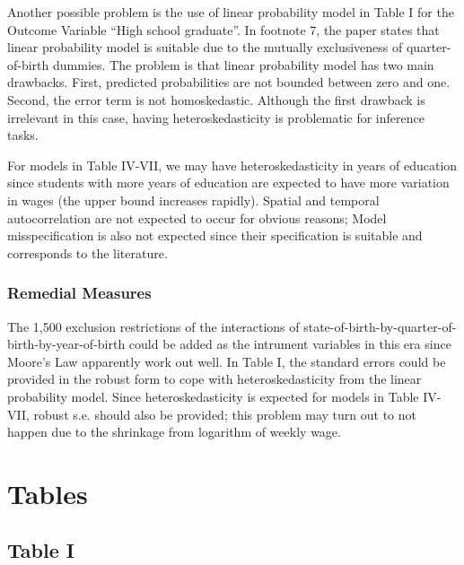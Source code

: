 \documentclass{article}
\begin{document}
Another possible problem is the use of linear probability model in Table I for the Outcome Variable ``High school graduate''. In footnote 7, the paper states that linear probability model is suitable due to the mutually exclusiveness of quarter-of-birth dummies. The problem is that linear probability model has two main drawbacks. First, predicted probabilities are not bounded between zero and one. Second, the error term is not homoskedastic. Although the first drawback is irrelevant in this case, having heteroskedasticity is problematic for inference tasks.

For models in Table IV-VII, we may have heteroskedasticity in years of education since students with more years of education are expected to have more variation in wages (the upper bound increases rapidly). Spatial and temporal autocorrelation are not expected to occur for obvious reasons; Model misspecification is also not expected since their specification is suitable and corresponds to the literature.

\subsubsection{Remedial Measures}
The 1,500 exclusion restrictions of the interactions of state-of-birth-by-quarter-of-birth-by-year-of-birth could be added as the intrument variables in this era since Moore's Law apparently work out well.
In Table I, the standard errors could be provided in the robust form to cope with heteroskedasticity from the linear probability model.
Since heteroskedasticity is expected for models in Table IV-VII, robust s.e. should also be provided; this problem may turn out to not happen due to the shrinkage from logarithm of weekly wage.




\clearpage 
\appendix
\appendixpage
\addappheadtotoc
\section{Tables}
\subsection{Table I}
\end{document}
